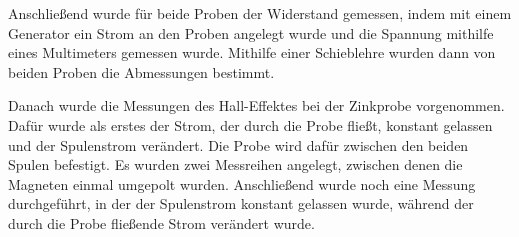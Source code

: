 Anschließend wurde für beide Proben der Widerstand gemessen, indem mit einem Generator
ein Strom an den Proben angelegt wurde und die Spannung mithilfe eines Multimeters
gemessen wurde. Mithilfe einer Schieblehre wurden dann
von beiden Proben die Abmessungen bestimmt.

Danach wurde die Messungen des Hall-Effektes bei der Zinkprobe vorgenommen.
Dafür wurde als  erstes der Strom, der durch die Probe fließt, konstant gelassen
und der Spulenstrom verändert. Die Probe wird dafür zwischen den beiden Spulen
befestigt. Es wurden zwei Messreihen angelegt, zwischen denen
die Magneten einmal umgepolt wurden. Anschließend wurde noch eine Messung durchgeführt,
in der der Spulenstrom konstant gelassen wurde, während der durch die Probe fließende
Strom verändert wurde.

